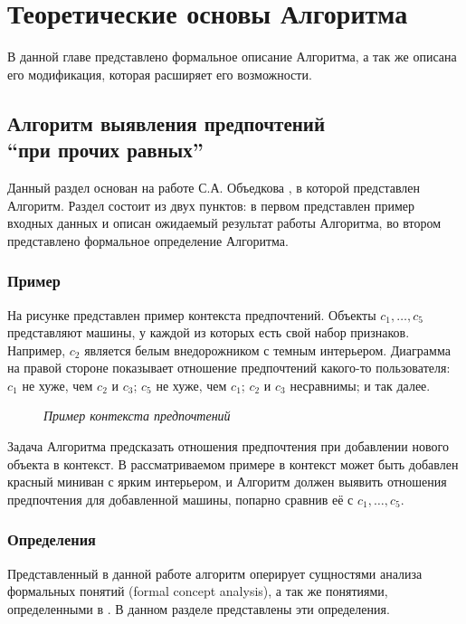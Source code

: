 \chapter{Теоретические основы Алгоритма}
\label{chapter:theory}

В данной главе представлено формальное описание Алгоритма, а так же описана его модификация, которая расширяет его возможности.
	
\section[Алгоритм выявления предпочтений \enquote{при прочих равных}]{ Алгоритм выявления предпочтений \\ \enquote{при прочих равных}}

	Данный раздел основан на работе С.А. Объедкова \cite{Obiedkov:2013}, в которой представлен Алгоритм. Раздел состоит из двух пунктов: в первом представлен пример входных данных и описан ожидаемый результат работы Алгоритма, во втором представлено формальное определение Алгоритма.
	
	\subsection{Пример}
	\label{subsection:example}
		На рисунке представлен пример контекста предпочтений. Объекты $c_1, \dotsc, c_5$ представляют машины, у каждой из которых есть свой набор признаков. Например, $c_2$ является белым внедорожником с темным интерьером. Диаграмма на правой стороне показывает отношение предпочтений какого-то пользователя: $c_1$ не хуже, чем $c_2$ и $c_3$; $c_5$ не хуже, чем $c_1$; $c_2$ и $c_3$ несравнимы; и так далее. 
		\begin{figure}
			\begin{center} 
				\cars \prefs
				\caption*{\it Пример контекста предпочтений \cite[Рис.~1.1]{Obiedkov:2013}}
				\label{fig:pcxt}	
			\end{center} 
		\end{figure} 
		
		Задача Алгоритма предсказать отношения предпочтения при добавлении нового объекта в контекст. В рассматриваемом примере в контекст может быть добавлен красный миниван с ярким интерьером, и Алгоритм должен выявить отношения предпочтения для добавленной машины, попарно сравнив её с $c_1, \dotsc, c_5$. 
	
	\subsection{Определения}
	\label{subsection:definitions}
		Представленный в данной работе алгоритм оперирует сущностями анализа формальных понятий (formal concept analysis)\cite{Ganter:1999}, а так же понятиями, определенными в \cite{Obiedkov:2012:preferences,Obiedkov:2012:modeling}. В данном разделе представлены эти определения.
		
